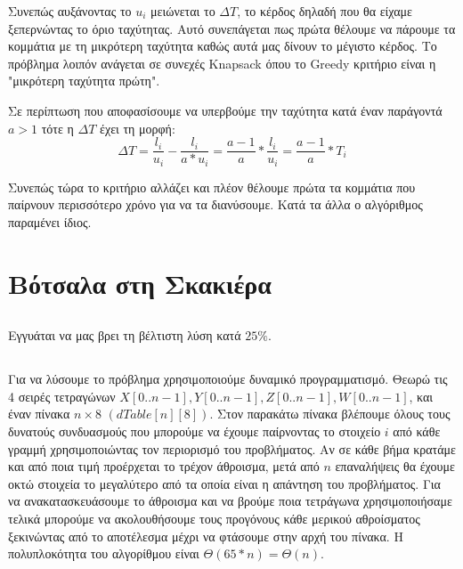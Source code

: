 \documentclass[a4paper,10pt]{article} \usepackage{anysize}
\begin{document}
Συνεπώς αυξάνοντας το $u_i$ μειώνεται το $\Delta{T}$, το κέρδος δηλαδή που θα
είχαμε ξεπερνώντας το όριο ταχύτητας. Αυτό συνεπάγεται πως πρώτα θέλουμε να
πάρουμε τα κομμάτια με τη μικρότερη ταχύτητα καθώς αυτά μας δίνουν το μέγιστο
κέρδος. Το πρόβλημα λοιπόν ανάγεται σε συνεχές Knapsack όπου το Greedy
κριτήριο είναι η "μικρότερη ταχύτητα πρώτη".

Σε περίπτωση που αποφασίσουμε να υπερβούμε την ταχύτητα κατά έναν παράγοντά
$a>1$ τότε η $\Delta{T}$ έχει τη μορφή:
\[
	\Delta{T}=\frac{l_i}{u_i} - \frac{l_i}{a*u_i} =
	\frac{a-1}{a}*\frac{l_i}{u_i} = \frac{a-1}{a}*T_i
\] 

Συνεπώς τώρα το κριτήριο αλλάζει και πλέον θέλουμε πρώτα τα κομμάτια που
παίρνουν περισσότερο χρόνο για να τα διανύσουμε. Κατά τα άλλα ο αλγόριθμος
παραμένει ίδιος.


\section{Βότσαλα στη Σκακιέρα}
\subsection{} Εγγυάται να μας βρει τη βέλτιστη λύση κατά $25\%$.
\subsection{} Για να λύσουμε το πρόβλημα χρησιμοποιούμε δυναμικό προγραμματισμό. Θεωρώ τις 4 σειρές
τετραγώνων $X[0..n-1],Y[0..n-1],Z[0..n-1],W[0..n-1]$, και έναν πίνακα
$n\times8$ $(dTable[n][8])$. Στον παρακάτω πίνακα βλέπουμε
όλους τους δυνατούς συνδυασμούς που μπορούμε να έχουμε παίρνοντας το στοιχείο
$i$ από κάθε γραμμή χρησιμοποιώντας τον περιορισμό του προβλήματος. Αν σε κάθε
βήμα κρατάμε και από ποια τιμή προέρχεται το τρέχον άθροισμα, μετά από $n$
επαναλήψεις θα έχουμε οκτώ στοιχεία το μεγαλύτερο από τα οποία είναι η
απάντηση του προβλήματος. Για να ανακατασκευάσουμε το άθροισμα και να βρούμε
ποια τετράγωνα χρησιμοποιήσαμε τελικά μπορούμε να ακολουθήσουμε τους προγόνους
κάθε μερικού αθροίσματος ξεκινώντας από το αποτέλεσμα μέχρι να φτάσουμε στην
αρχή του πίνακα. Η πολυπλοκότητα του αλγορίθμου είναι
$\Theta{(65*n)}=\Theta{(n)}$.
\end{document}
